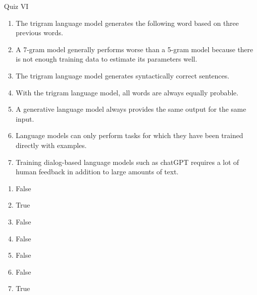 \documentclass{article}
\begin{document}
\begin{exercise}{Quiz VI}
  \begin{enumerate}
    \item The trigram language model generates the following word based on three previous words.
    \item A 7-gram model generally performs worse than a 5-gram model because there is not enough training data to estimate its parameters well.
    \item The trigram language model generates syntactically correct sentences.
    \item With the trigram language model, all words are always equally probable.
    \item A generative language model always provides the same output for the same input.
    \item Language models can only perform tasks for which they have been trained directly with examples.
    \item Training dialog-based language models such as chatGPT requires a lot of human feedback in addition to large amounts of text.
  \end{enumerate}

  \begin{solution}
    \begin{enumerate}
      \item False
      \item True
      \item False
      \item False
      \item False
      \item False
      \item True
    \end{enumerate}
  \end{solution}
\end{exercise}
\end{document}
